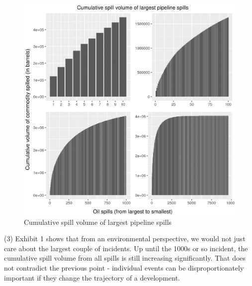 \documentclass[12pt, man, natbib]{apa6}
\begin{document}
	\begin{figure}
	\caption{Cumulative spill volume of largest pipeline spills}
	\includegraphics{figures/cumulative_spill_volume.jpg}
	\end{figure}
	 
	(3) Exhibit 1 shows that from an environmental perspective, we would not just care about the largest couple of incidents. Up until the 1000s or so incident, the cumulative spill volume from all spills is still increasing significantly. That does not contradict the previous point - individual events can be disproportionately important if they change the trajectory of a development.
	

	

\end{document}
